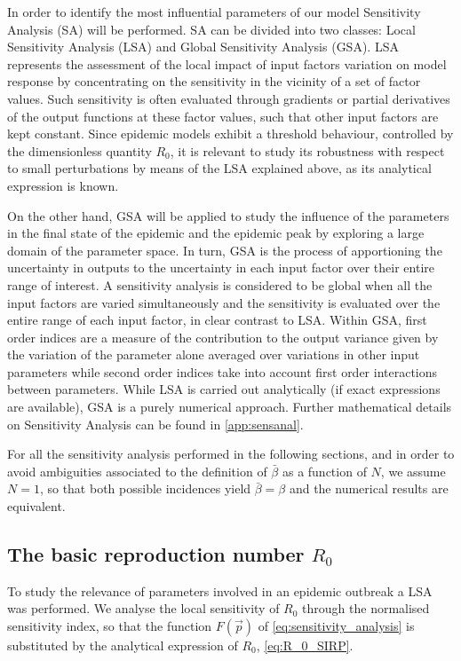 In order to identify the most influential parameters of our model
Sensitivity Analysis (SA) will be performed. SA can be divided into two
classes: Local Sensitivity Analysis (LSA) and Global Sensitivity Analysis
(GSA). LSA represents the assessment of the local impact of input factors
variation on model response by concentrating on the sensitivity in the vicinity
of a set of factor values. Such sensitivity is often evaluated through
gradients or partial derivatives of the output functions at these factor
values, such that other input factors are kept constant.
Since epidemic models exhibit a threshold behaviour, controlled by the
dimensionless quantity
$R_0$, it is relevant to study its robustness with respect to small
perturbations by means of the LSA explained above, as its analytical expression
is known.

On the other hand, GSA will be applied to study the influence of the
parameters in the final state of the epidemic and the epidemic peak by
exploring a large domain of the parameter space. In turn, GSA is the process of
apportioning the uncertainty in outputs to the uncertainty in each input factor
over their entire range of interest. A sensitivity analysis is considered to be
global when all the input factors are varied simultaneously and the sensitivity
is evaluated over the entire range of each input factor, in clear contrast to
LSA. Within GSA, first order indices are a measure of the contribution to the
output variance given by the variation of the parameter alone averaged over
variations in other input parameters while second order indices take into
account first order interactions between parameters. While LSA is carried out
analytically (if exact expressions are available), GSA is a purely numerical
approach. Further mathematical details on Sensitivity Analysis can be found in
\ref{app:sensanal}.

For all the sensitivity analysis performed in the following sections, and
in order to avoid ambiguities associated to the definition of $\bar{\beta}$ as
a function of $N$, we assume $N=1$, so that both possible incidences yield
$\bar{\beta}=\beta$ and the numerical results are equivalent.

\subsection{The basic reproduction number $R_0$}

To study the relevance of parameters involved in an epidemic outbreak a LSA
was performed. We analyse the local sensitivity of $R_0$ through the normalised
sensitivity index, so that the function $F(\vec{p})$ of
\cref{eq:sensitivity_analysis} is substituted by the analytical expression of
$R_0$, \cref{eq:R_0_SIRP}.

